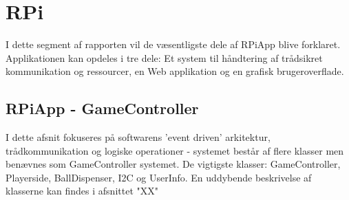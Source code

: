 \documentclass[Rapport/Rapport_main.tex]{subfiles}
\begin{document}
\section{RPi}
I dette segment af rapporten vil de væsentligste dele af RPiApp blive forklaret. Applikationen kan opdeles i tre dele: Et system til håndtering af trådsikret kommunikation og ressourcer, en Web applikation og en grafisk brugeroverflade. 
\subsection{RPiApp - GameController}
I dette afsnit fokuseres på softwarens 'event driven' arkitektur, trådkommunikation og logiske operationer - systemet består af flere klasser men benævnes som GameController systemet. De vigtigste klasser: GameController, Playerside, BallDispenser, I2C og UserInfo. En uddybende beskrivelse af klasserne kan findes i afsnittet "XX"
\end{document}
